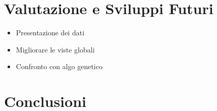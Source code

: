 \documentclass[a4paper,10pt,abstracton]{scrartcl}
\begin{document}
\section{Valutazione e Sviluppi Futuri}
\begin{itemize}
 \item Presentazione dei dati
 \item Migliorare le viste globali
 \item Confronto con algo genetico
\end{itemize}


\section{Conclusioni}
\end{document}
